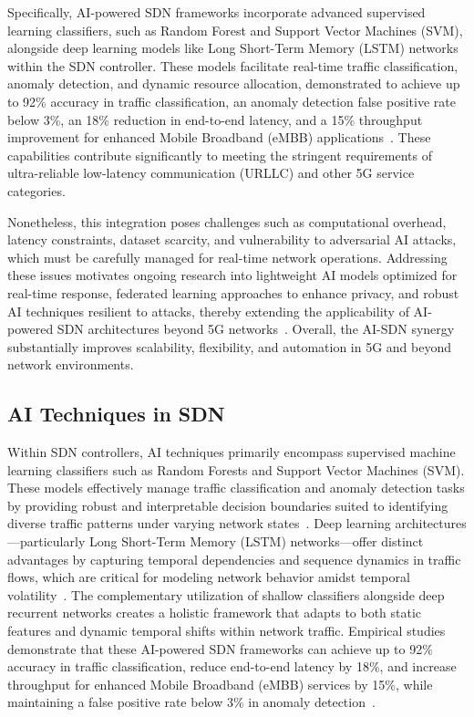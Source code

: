 \documentclass[sigconf]{acmart}
\begin{document}
Specifically, AI-powered SDN frameworks incorporate advanced supervised learning classifiers, such as Random Forest and Support Vector Machines (SVM), alongside deep learning models like Long Short-Term Memory (LSTM) networks within the SDN controller. These models facilitate real-time traffic classification, anomaly detection, and dynamic resource allocation, demonstrated to achieve up to 92\% accuracy in traffic classification, an anomaly detection false positive rate below 3\%, an 18\% reduction in end-to-end latency, and a 15\% throughput improvement for enhanced Mobile Broadband (eMBB) applications~\cite{ref52}. These capabilities contribute significantly to meeting the stringent requirements of ultra-reliable low-latency communication (URLLC) and other 5G service categories.

Nonetheless, this integration poses challenges such as computational overhead, latency constraints, dataset scarcity, and vulnerability to adversarial AI attacks, which must be carefully managed for real-time network operations. Addressing these issues motivates ongoing research into lightweight AI models optimized for real-time response, federated learning approaches to enhance privacy, and robust AI techniques resilient to attacks, thereby extending the applicability of AI-powered SDN architectures beyond 5G networks~\cite{ref52}. Overall, the AI-SDN synergy substantially improves scalability, flexibility, and automation in 5G and beyond network environments.

\subsection{AI Techniques in SDN}

Within SDN controllers, AI techniques primarily encompass supervised machine learning classifiers such as Random Forests and Support Vector Machines (SVM). These models effectively manage traffic classification and anomaly detection tasks by providing robust and interpretable decision boundaries suited to identifying diverse traffic patterns under varying network states~\cite{ref52}. Deep learning architectures—particularly Long Short-Term Memory (LSTM) networks—offer distinct advantages by capturing temporal dependencies and sequence dynamics in traffic flows, which are critical for modeling network behavior amidst temporal volatility~\cite{ref52}. The complementary utilization of shallow classifiers alongside deep recurrent networks creates a holistic framework that adapts to both static features and dynamic temporal shifts within network traffic. Empirical studies demonstrate that these AI-powered SDN frameworks can achieve up to 92\% accuracy in traffic classification, reduce end-to-end latency by 18\%, and increase throughput for enhanced Mobile Broadband (eMBB) services by 15\%, while maintaining a false positive rate below 3\% in anomaly detection~\cite{ref52}. 
\end{document}
